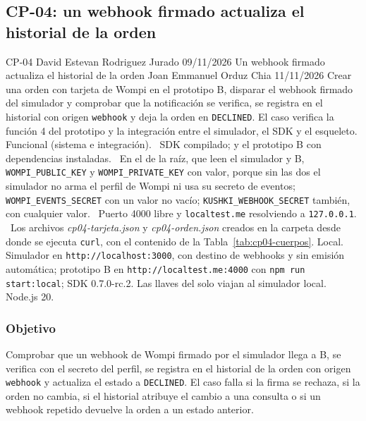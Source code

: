 \subsection{CP-04: un webhook firmado actualiza el historial de la orden}
\label{sec:cp04}

\FichaCaso
  {CP-04}
  {David Estevan Rodriguez Jurado}
  {09/11/2026}
  {Un webhook firmado actualiza el historial de la orden}
  {Joan Emmanuel Orduz Chia}
  {11/11/2026}
  {Crear una orden con tarjeta de Wompi en el prototipo B, disparar el webhook firmado del simulador y comprobar que la notificación se verifica, se registra en el historial con origen \texttt{webhook} y deja la orden en \texttt{DECLINED}. El caso verifica la función 4 del prototipo y la integración entre el simulador, el SDK y el esqueleto.}
  {Funcional (sistema e integración).}
  {\textbullet\ SDK compilado;  y el prototipo B con dependencias instaladas.\newline
   \textbullet\ En el  de la raíz, que leen el simulador y B, \texttt{WOMPI\_PUBLIC\_KEY} y \texttt{WOMPI\_PRIVATE\_KEY} con valor, porque sin las dos el simulador no arma el perfil de Wompi ni usa su secreto de eventos; \texttt{WOMPI\_EVENTS\_SECRET} con un valor no vacío; \texttt{KUSHKI\_WEBHOOK\_SECRET} también, con cualquier valor.\newline
   \textbullet\ Puerto 4000 libre y \texttt{localtest.me} resolviendo a \texttt{127.0.0.1}.\newline
   \textbullet\ Los archivos \emph{cp04-tarjeta.json} y \emph{cp04-orden.json} creados en la carpeta desde donde se ejecuta \texttt{curl}, con el contenido de la Tabla~\ref{tab:cp04-cuerpos}.}
  {Local. Simulador en \texttt{http://localhost:3000}, con destino de webhooks y sin emisión automática; prototipo B en \texttt{http://localtest.me:4000} con \texttt{npm run start:local}; SDK 0.7.0-rc.2. Las llaves del  solo viajan al simulador local. Node.js 20.}

\subsubsection{Objetivo}

Comprobar que un webhook de Wompi firmado por el simulador llega a B, se verifica con el secreto del perfil, se registra en el historial de la orden con origen \texttt{webhook} y actualiza el estado a \texttt{DECLINED}. El caso falla si la firma se rechaza, si la orden no cambia, si el historial atribuye el cambio a una consulta o si un webhook repetido devuelve la orden a un estado anterior.


